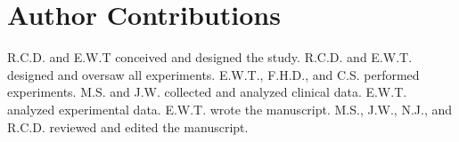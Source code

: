 \section{Author Contributions} 
R.C.D. and E.W.T conceived and designed the study. R.C.D. and E.W.T. designed and oversaw all experiments. E.W.T., F.H.D., and C.S. performed experiments. M.S. and J.W. collected and analyzed clinical data. E.W.T. analyzed experimental data. E.W.T. wrote the manuscript. M.S., J.W., N.J., and R.C.D. reviewed and edited the manuscript.